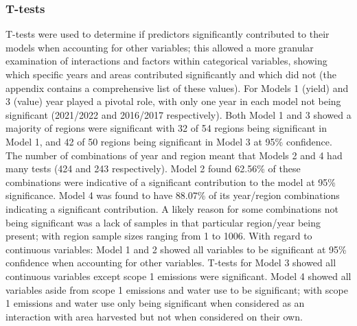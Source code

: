 \documentclass[review,12pt,authoryear]{elsarticle}
\begin{document}
\begin{linenumbers}
\subsubsection{T-tests}
T-tests were used to determine if predictors significantly contributed to their models when accounting for other variables; this allowed a more granular examination of interactions and factors within categorical variables, showing which specific years and areas contributed significantly and which did not (the appendix contains a comprehensive list of these values). 
\newline
For Models 1 (yield) and 3 (value) year played a pivotal role, with only one year in each model not being significant (2021/2022 and 2016/2017 respectively). Both Model 1 and 3 showed a majority of regions were significant with 32 of 54 regions being significant in Model 1, and 42 of 50 regions being significant in Model 3 at 95\% confidence.
\newline
The number of combinations of year and region meant that Models 2 and 4 had many tests (424 and 243 respectively). Model 2 found 62.56\% of these combinations were indicative of a significant contribution to the model at 95\% significance. Model 4 was found to have 88.07\% of its year/region combinations indicating a significant contribution. A likely reason for some combinations not being significant was a lack of samples in that particular region/year being present; with region sample sizes ranging from 1 to 1006.
\newline
With regard to continuous variables: Model 1 and 2 showed all variables to be significant at 95\% confidence when accounting for other variables. T-tests for Model 3 showed all continuous variables except scope 1 emissions were significant. Model 4 showed all variables aside from scope 1 emissions and water use to be significant; with scope 1 emissions and water use only being significant when considered as an interaction with area harvested but not when considered on their own.

\end{linenumbers}
\end{document}
